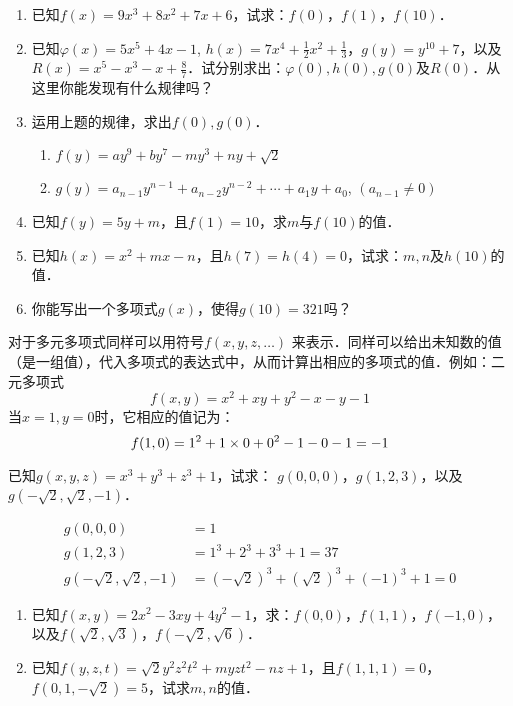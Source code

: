 \begin{ex}
    \begin{enumerate}
        \item 已知$f(x)=9x^3+8x^2+7x+6$，试求：$f(0)$，$f(1)$，$f(10)$．
        \item 已知$\varphi(x)=5x^5+4x-1$, $h(x)=7x^4+\frac{1}{2}x^2+\frac{1}{3}$，$g(y)=y^{10}+7$，以及$R(x)=x^5-x^3-x+\frac{8}{7}$．试分别求出：$\varphi(0), h(0), g(0)$及$R(0)$．从这里你能发现有什么规律吗？
        \item 运用上题的规律，求出$f(0),g(0)$．
        \begin{enumerate}
            \item $f(y)=ay^9+by^7-my^3+ny+\sqrt{2}$
            \item $g(y)=a_{n-1}y^{n-1}+a_{n-2}y^{n-2}+\cdots+a_1 y+a_0$, $(a_{n-1}\ne 0)$
        \end{enumerate}
        \item 已知$f(y)=5y+m$，且$f(1)=10$，求$m$与$f(10)$的值．
        \item 已知$h(x)=x^2+mx-n$，且$h(7)=h(4)=0$，试求：$m,n$及$h(10)$的值．
        \item 你能写出一个多项式$g(x)$，使得$g(10)=321$吗？
    \end{enumerate}
\end{ex}

对于多元多项式同样可以用符号$f(x,y,z,\ldots)$
来表示．同样可以给出未知数的值（是一组值），代入多项式的表达式中，从而计算出相应的多项式的值．例如：二元多项式$$f(x,y)=x^2+xy+y^2-x-y-1  $$
当$x=1,y=0$时，它相应的值记为：
$$f (1, 0) =1^2+1\times0+0^2-1-0-1=-1$$

\begin{example}
    已知$g(x,y,z)=x^3+y^3+z^3+1$，试求：
$g(0,0,0)$，$g(1,2,3)$，以及$g\left(-\sqrt{2},\sqrt{2},-1\right)$．
\end{example}

\begin{solution}
    \[\begin{split}
        g(0,0,0)&=1\\
        g(1,2,3)&=1^3+2^3+3^3+1=37\\
        g\left(-\sqrt{2},\sqrt{2},-1\right)&=\left(-\sqrt{2}\right)^3+\left(\sqrt{2}\right)^3+(-1)^3+1=0
    \end{split}\]
\end{solution}

\begin{ex}
    \begin{enumerate}
        \item 已知$f(x,y)=2x^2-3xy+4y^2-1$，求：$f(0,0)$，$f(1,1)$，$f(-1,0)$，以及$f(\sqrt{2},\sqrt{3})$，$f(-\sqrt{2},\sqrt{6})$．
        \item 已知$f(y,z,t)=\sqrt{2}y^2z^2t^2+myzt^2-nz+1$，且$f(1,1,1)=0$，$f(0,1,-\sqrt{2})=5$，试求$m,n$的值．
    \end{enumerate}
\end{ex}

